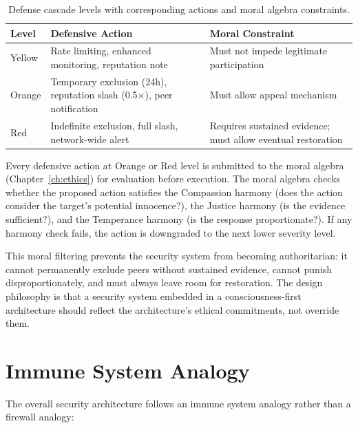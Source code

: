 \documentclass[12pt]{book}
\begin{document}
\begin{table}[H]
\centering
\caption{Defense cascade levels with corresponding actions and moral algebra constraints.}
\label{tab:defense-cascade}
\begin{tabular}{lp{4cm}p{4cm}}
\toprule
\textbf{Level} & \textbf{Defensive Action} & \textbf{Moral Constraint} \\
\midrule
Yellow & Rate limiting, enhanced monitoring, reputation note & Must not impede legitimate participation \\
Orange & Temporary exclusion (24h), reputation slash (0.5$\times$), peer notification & Must allow appeal mechanism \\
Red & Indefinite exclusion, full slash, network-wide alert & Requires sustained evidence; must allow eventual restoration \\
\bottomrule
\end{tabular}
\end{table}

Every defensive action at Orange or Red level is submitted to the moral algebra (Chapter~\ref{ch:ethics}) for evaluation before execution. The moral algebra checks whether the proposed action satisfies the Compassion harmony (does the action consider the target's potential innocence?), the Justice harmony (is the evidence sufficient?), and the Temperance harmony (is the response proportionate?). If any harmony check fails, the action is downgraded to the next lower severity level.

This moral filtering prevents the security system from becoming authoritarian: it cannot permanently exclude peers without sustained evidence, cannot punish disproportionately, and must always leave room for restoration. The design philosophy is that a security system embedded in a consciousness-first architecture should reflect the architecture's ethical commitments, not override them.

\section{Immune System Analogy}

The overall security architecture follows an immune system analogy rather than a firewall analogy:
\end{document}
